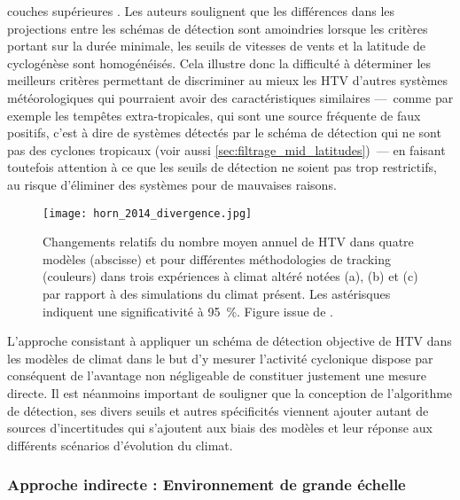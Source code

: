 \documentclass[../main.tex]{subfiles}
\begin{document}
couches supérieures \parencite{horn_tracking_2014}. Les auteurs soulignent que les différences dans les projections entre les schémas de détection sont
amoindries lorsque les critères portant sur la durée minimale, les seuils de vitesses de vents et la latitude de cyclogénèse sont homogénéisés. Cela illustre
donc la difficulté à déterminer les meilleurs critères permettant de discriminer au mieux les HTV d'autres systèmes météorologiques qui pourraient avoir des
caractéristiques similaires ---~comme par exemple les tempêtes extra-tropicales, qui sont une source fréquente de faux positifs, c'est à dire de systèmes
détectés par le schéma de détection qui ne sont pas des cyclones tropicaux (voir aussi \cref{sec:filtrage_mid_latitudes})~--- en faisant toutefois attention à
ce que les seuils de détection ne soient pas trop restrictifs, au risque d'éliminer des systèmes pour de mauvaises raisons.

\begin{figure}[tb]
    \centering
    \texttt{[image: horn\_2014\_divergence.jpg]}
    \caption{Changements relatifs du nombre moyen annuel de HTV dans quatre modèles (abscisse) et pour différentes méthodologies de tracking (couleurs) dans
    trois expériences à climat altéré notées (a), (b) et (c) par rapport à des simulations du climat présent. Les astérisques indiquent une significativité à
    \SI{95}{\percent}. Figure issue de \textcite{horn_tracking_2014}.}
    \label{fig:horn_2014_projections}
\end{figure}

L'approche consistant à appliquer un schéma de détection objective de HTV dans les modèles de climat dans le but d'y mesurer l'activité cyclonique dispose par
conséquent de l'avantage non négligeable de constituer justement une mesure directe. Il est néanmoins important de souligner que la conception de l'algorithme
de détection, ses divers seuils et autres spécificités viennent ajouter autant de sources d'incertitudes qui s'ajoutent aux biais des modèles et leur réponse
aux différents scénarios d'évolution du climat.

\subsubsection{Approche indirecte : Environnement de grande échelle}\label{sec:intro_indices}
\end{document}
